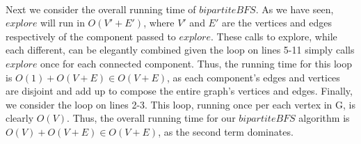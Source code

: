 \documentclass{article}
\begin{document}
\begin{enumerate}
\\ Next we consider the overall running time of $bipartiteBFS$. As we have seen, $explore$ will run in $O(V'+E')$, where $V'$ and $E'$ are the vertices and edges respectively of the component passed to $explore$. These calls to explore, while each different, can be elegantly combined given the loop on lines 5-11 simply calls $explore$ once for each connected component. Thus, the running time for this loop is $O(1)+O(V+E)\in O(V+E)$, as each component's edges and vertices are disjoint and add up to compose the entire graph's vertices and edges. Finally, we consider the loop on lines 2-3. This loop, running once per each vertex in G, is clearly $O(V)$. Thus, the overall running time for our $bipartiteBFS$ algorithm is $O(V)+O(V+E)\in O(V+E)$, as the second term dominates.
\end{enumerate}
	
\end{document}
